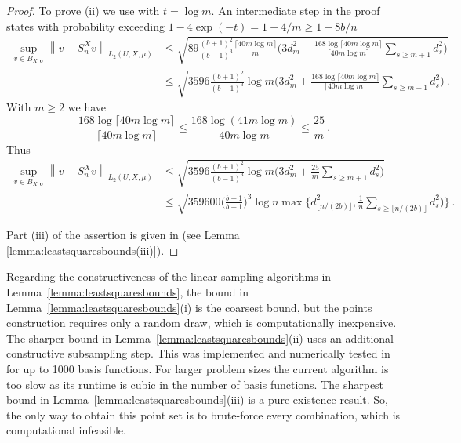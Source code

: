 \documentclass[11pt]{article}
\numberwithin{equation}{section}
\theoremstyle{definition}
\theoremstyle{remark}
\newcommand{\norm}[2]{\left\|{#1}\right\|_{#2}}
\newcommand{\bsigma}{{\boldsymbol{\sigma}}}
\begin{document}
{{\begin{proof}
    To prove (ii) we use \cite[Theorem~7.8]{barteldiss} with $t=\log m$.
    An intermediate step in the proof states with probability exceeding $1-4\exp(-t) = 1-4/m \ge 1-8b/n$
    \begin{align*}
        \sup_{v\in B_{X,\bsigma}} \norm{v - S_{n}^X v}{L_2(U,X;\mu)}
        &\le \sqrt{ 89 \frac{(b+1)^2}{(b-1)^3} \frac{\lceil 40 m \log m\rceil}{m}
        \Big( 3 d_{m}^2 + \frac{168 \log \lceil 40 m\log m\rceil }{\lceil 40 m\log m\rceil } \sum_{s\ge m+1} d_s^2 \Big) } \\
        &\le \sqrt{ 3596 \frac{(b+1)^2}{(b-1)^3} \log m
        \Big( 3 d_{m}^2 + \frac{168 \log \lceil 40 m\log m\rceil }{\lceil 40 m\log m\rceil } \sum_{s\ge m+1} d_s^2 \Big) } \,.
    \end{align*}
    With $m\ge 2$ we have
    \begin{equation*}
        \frac{168 \log \lceil 40 m\log m\rceil }{\lceil 40 m\log m\rceil }
        \le \frac{168 \log ( 41 m\log m) }{40 m\log m}
        \le \frac{25}{m} \,.
    \end{equation*}
    Thus
    \begin{align*}
        \sup_{v\in B_{X,\bsigma}} \norm{v - S_{n}^X v}{L_2(U,X;\mu)}
        &\le \sqrt{ 3596 \frac{(b+1)^2}{(b-1)^3} \log m
        \Big( 3 d_{m}^2 + \frac{25}{m} \sum_{s\ge m+1} d_s^2 \Big) } \\
        &\le \sqrt{ 359600 \Big(\frac{b+1}{b-1}\Big)^3 \log n
        \max\Big\{ d_{\lfloor n/(2b)\rfloor}^2, \frac{1}{n} \sum_{s\ge \lfloor  n/(2b)\rfloor} d_s^2 \Big) \Big\} } \,.
    \end{align*}
    
    Part (iii) of the assertion is given in \cite[Theorem~23]{DKU2023} 
    (see Lemma \ref{lemma:leastsquaresbounds(iii)}).
	\hfill
\end{proof}
}




Regarding the constructiveness of the linear sampling algorithms in Lemma~\ref{lemma:leastsquaresbounds}, the bound in Lemma~\ref{lemma:leastsquaresbounds}(i) is the coarsest bound, but the points construction requires only a random draw, which is computationally inexpensive.
The sharper bound in Lemma~\ref{lemma:leastsquaresbounds}(ii) uses an additional constructive subsampling step.
This was implemented and numerically tested in \cite{BSU23} for up to 1000 basis functions.
For larger problem sizes the current algorithm is too slow as its runtime is cubic in the number of basis functions.
The sharpest bound in Lemma~\ref{lemma:leastsquaresbounds}(iii) is a pure existence result.
So, the only way to obtain this point set is to brute-force every combination, which is computational infeasible.

}
\end{document}
